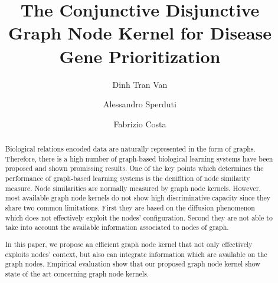 \documentclass[review]{elsarticle}
\begin{document}
\begin{frontmatter}

\title{The Conjunctive Disjunctive Graph Node Kernel for Disease Gene Prioritization}

\author{Dinh Tran Van}
\author{Alessandro Sperduti}
\address{Department of Mathematics, Padova University, Trieste, 63, 35121 Padova, Italy}
\author{Fabrizio Costa}
\address{Department of Computer Science, University of Exeter Exeter EX4 4QF, UK}




\begin{abstract}
Biological relations encoded data are naturally represented in the form of graphs. Therefore, there is a high number of graph-based biological learning systems have been proposed and shown promissing results. One of the key points which determines the performance of graph-based learning systems is the denifition of node similarity measure. Node similarities are normally measured by graph node kernels. However, most available graph node kernels do not show high discriminative capacity since they share two common limitations. First they are based on the diffusion phenomenon which does not effectively exploit the nodes' configuration. Second they are not able to take into account the available information associated to nodes of graph.

In this paper, we propose an efficient graph node kernel that not only effectively exploits nodes' context, but also can integrate information which are available on the graph nodes. Empirical evaluation show that our proposed graph node kernel show state of the art concerning graph node kernels.

\end{abstract}


\end{frontmatter}
\end{document}
